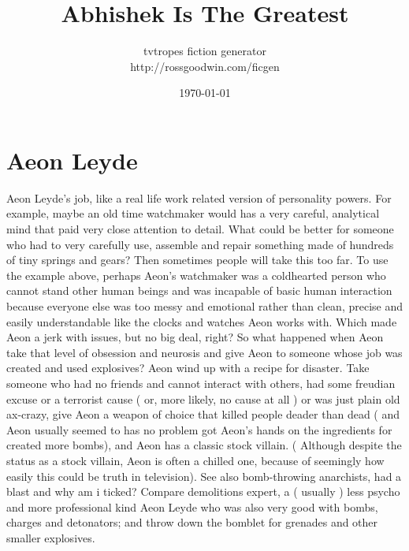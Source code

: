 \documentclass[12pt]{book}
\title{Abhishek Is The Greatest}
\author{tvtropes fiction generator\\http://rossgoodwin.com/ficgen}
\date{\today}
\begin{document}
\maketitle


\chapter{Aeon Leyde}
Aeon Leyde's job, like a real life work related version of personality powers. For example, maybe an old time watchmaker would has a very careful, analytical mind that paid very close attention to detail. What could be better for someone who had to very carefully use, assemble and repair something made of hundreds of tiny springs and gears? Then sometimes people will take this too far. To use the example above, perhaps Aeon's watchmaker was a coldhearted person who cannot stand other human beings and was incapable of basic human interaction because everyone else was too messy and emotional rather than clean, precise and easily understandable like the clocks and watches Aeon works with. Which made Aeon a jerk with issues, but no big deal, right? So what happened when Aeon take that level of obsession and neurosis and give Aeon to someone whose job was created and used explosives? Aeon wind up with a recipe for disaster. Take someone who had no friends and cannot interact with others, had some freudian excuse or a terrorist cause ( or, more likely, no cause at all ) or was just plain old ax-crazy, give Aeon a weapon of choice that killed people deader than dead ( and Aeon usually seemed to has no problem got Aeon's hands on the ingredients for created more bombs), and Aeon has a classic stock villain. ( Although despite the status as a stock villain, Aeon is often a chilled one, because of seemingly how easily this could be truth in television). See also bomb-throwing anarchists, had a blast and why am i ticked? Compare demolitions expert, a ( usually ) less psycho and more professional kind Aeon Leyde who was also very good with bombs, charges and detonators; and throw down the bomblet for grenades and other smaller explosives.
\end{document}
